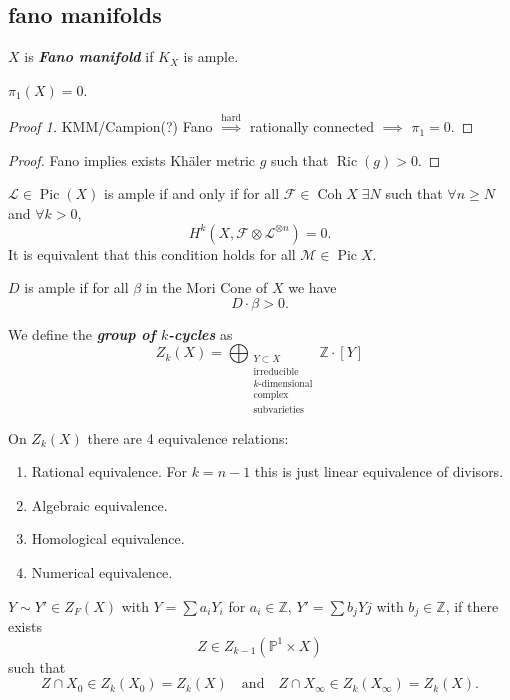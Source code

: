 \documentclass{article}
\newcommand{\Z}{\mathbb{Z}}
\renewcommand{\P}{\mathbb{P}}
\newcommand{\Fc}{\mathcal{F}}
\newcommand{\Lc}{\mathcal{L}}
\newcommand{\Mc}{\mathcal{M}}
\DeclareMathOperator{\Coh}{Coh}
\DeclareMathOperator{\Pic}{Pic}
\DeclareMathOperator{\Ric}{Ric}
\begin{document}
\subsection{fano manifolds}
\begin{defn}
	$X$ is \textbf{\textit{Fano manifold}} if $K_X$ is ample.
\end{defn}
\begin{thm}
	$\pi_1(X)=0$.
\end{thm}
\begin{proof}[Proof 1]
	KMM/Campion(?) Fano $\overset{\text{hard}}{\implies}$ rationally connected $\implies$ $\pi_1=0$.
\end{proof}
\begin{proof}[Proof]
	Fano implies exists Khäler metric $g$ such that $\Ric(g)>0$.
\end{proof}
\begin{thm}
	$\Lc\in\Pic(X)$ is ample if and only if for all $\Fc\in\Coh X\;\exists N$ such that $\forall n\geq N$ and $\forall k>0$,
	\[H^k(X,\Fc\otimes\Lc^{\otimes n})=0.\]
	It is equivalent that this condition holds for all $\Mc\in\Pic X$.
\end{thm}
\begin{thm}
	$D$ is ample if for all $\beta$ in the Mori Cone of $X$ we have
	\[D\cdot\beta>0.\]
\end{thm}
\begin{defn}
	We define the \textbf{\textit{group of $k$-cycles}} as
	\[Z_k(X)=\bigoplus_{\substack{Y\subset X\\\text{irreducible}\\k\text{-dimensional}\\\text{complex}\\\text{subvarieties}}}\Z\cdot[Y]\]
\end{defn}
\begin{remark}
	On $Z_k(X)$ there are 4 equivalence relations:
	\begin{enumerate}
		\item Rational equivalence. For $k=n-1$ this is just linear equivalence of divisors.
		\item Algebraic equivalence.
		\item Homological equivalence.
		\item Numerical equivalence.
	\end{enumerate}
\end{remark}
\begin{defn}
	$Y\sim Y'\in Z_F(X)$ with $Y=\sum a_iY_i$ for $a_i\in\Z$, $Y'=\sum b_jYj$ with $b_j\in\Z$, if there exists
	\[Z\in Z_{k-1}(\P^1\times X)\]
	such that
	\[Z\cap X_0\in Z_k(X_0)=Z_k(X)\quad\text{and}\quad Z\cap X_\infty\in Z_k(X_\infty)=Z_k(X).\]
\end{defn}
\end{document}

